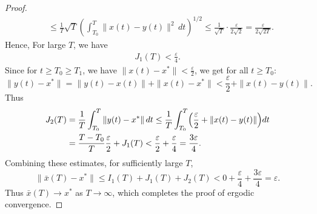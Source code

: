 \documentclass[hidelinks,11 pt]{article}
\numberwithin{equation}{section}
\theoremstyle{definition}  %
\numberwithin{equation}{section}
\numberwithin{theorem}{section}
\begin{document}
\begin{proof}
\begin{align*}
    & \leq \frac{1}{T} \sqrt{T} \left( \int_{T_0}^T \|x(t) - y(t)\|^2\,dt \right)^{1/2}\leq \frac{1}{\sqrt{T}}\cdot \frac{\varepsilon}{2\sqrt{2}} = \frac{\varepsilon}{2\sqrt{2T}}. 
\end{align*}
Hence,  For large $T$, we have 
\begin{align*}
    J_{1}(T)<\frac{\varepsilon}{4}.
\end{align*}
Since for $t\ge T_0\ge T_1$, we have $\|x(t)-x^*\|<\frac{\varepsilon}{2}$, we get for all $t\ge T_0$: 
\begin{equation*}
     \|y(t)-x^*\| = \|y(t)-x(t)\|+\|x(t)-x^*\| < \frac{\varepsilon}{2} + \|x(t)-y(t)\|.
\end{equation*}
Thus 
\begin{align*}
    J_2(T)& = \frac{1}{T} \int_{T_0}^T \|y(t)-x^*\|\,dt 
    \le \frac{1}{T} \int_{T_0}^T \Bigl(\frac{\varepsilon}{2} + \|x(t)-y(t)\|\Bigr) dt\\
    &= \frac{T- T_0}{T}\frac{\varepsilon}{2} + J_1(T)<\frac{\varepsilon}{2}+\frac{\varepsilon}{4} = \frac{3\varepsilon}{4}.
\end{align*}
Combining these estimates, for sufficiently large $T$, 
\begin{equation*}
     \|\bar{x}(T)-x^*\| \le I_1(T) + J_1(T) + J_2(T) < 0 +
\frac{\varepsilon}{4} + \frac{3\varepsilon}{4} = \varepsilon. 
\end{equation*}
Thus $\bar{x}(T)\to x^*$ as $T\to\infty$, which completes the proof of ergodic convergence.
\end{proof}
\end{document}
